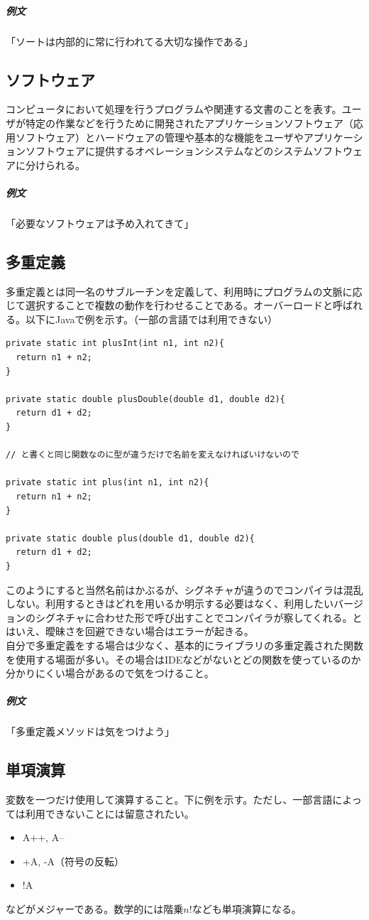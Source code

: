 \documentclass[a4paper]{ltjsreport}
\begin{document}
\subparagraph{例文}「ソートは内部的に常に行われてる大切な操作である」

\subsection{ソフトウェア}
コンピュータにおいて処理を行うプログラムや関連する文書のことを表す。ユーザが特定の作業などを行うために開発されたアプリケーションソフトウェア（応用ソフトウェア）とハードウェアの管理や基本的な機能をユーザやアプリケーションソフトウェアに提供するオペレーションシステムなどのシステムソフトウェアに分けられる。

\subparagraph{例文}「必要なソフトウェアは予め入れてきて」

\subsection{多重定義}
多重定義とは同一名のサブルーチンを定義して、利用時にプログラムの文脈に応じて選択することで複数の動作を行わせることである。オーバーロードと呼ばれる。以下にJavaで例を示す。（一部の言語では利用できない）

\lstset{language=Java}
\begin{lstlisting}
private static int plusInt(int n1, int n2){
  return n1 + n2;
}

private static double plusDouble(double d1, double d2){
  return d1 + d2;
}

// と書くと同じ関数なのに型が違うだけで名前を変えなければいけないので

private static int plus(int n1, int n2){
  return n1 + n2;
}

private static double plus(double d1, double d2){
  return d1 + d2;
}
\end{lstlisting}
このようにすると当然名前はかぶるが、シグネチャが違うのでコンパイラは混乱しない。利用するときはどれを用いるか明示する必要はなく、利用したいバージョンのシグネチャに合わせた形で呼び出すことでコンパイラが察してくれる。とはいえ、曖昧さを回避できない場合はエラーが起きる。
\\

自分で多重定義をする場合は少なく、基本的にライブラリの多重定義された関数を使用する場面が多い。その場合はIDEなどがないとどの関数を使っているのか分かりにくい場合があるので気をつけること。

\subparagraph{例文}「多重定義メソッドは気をつけよう」

\subsection{単項演算}
変数を一つだけ使用して演算すること。下に例を示す。ただし、一部言語によっては利用できないことには留意されたい。
\begin{itemize}
  \item A++, A--
  \item +A, -A（符号の反転）
  \item !A
\end{itemize}
などがメジャーである。数学的には階乗$n!$なども単項演算になる。
\end{document}
